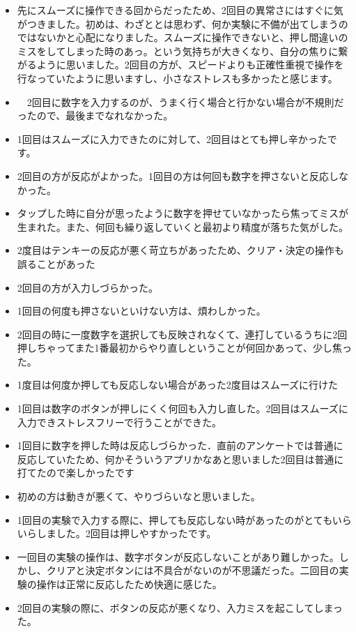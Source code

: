 \begin{itemize}
  \item 先にスムーズに操作できる回からだったため、2回目の異常さにはすぐに気がつきました。初めは、わざととは思わず、何か実験に不備が出てしまうのではないかと心配になりました。スムーズに操作できないと、押し間違いのミスをしてしまった時のあっ。という気持ちが大きくなり、自分の焦りに繋がるように思いました。2回目の方が、スピードよりも正確性重視で操作を行なっていたように思いますし、小さなストレスも多かったと感じます。
  \item 　2回目に数字を入力するのが、うまく行く場合と行かない場合が不規則だったので、最後までなれなかった。
  \item 1回目はスムーズに入力できたのに対して、2回目はとても押し辛かったです。
  \item 2回目の方が反応がよかった。1回目の方は何回も数字を押さないと反応しなかった。
  \item タップした時に自分が思ったように数字を押せていなかったら焦ってミスが生まれた。また、何回も繰り返していくと最初より精度が落ちた気がした。
  \item 2度目はテンキーの反応が悪く苛立ちがあったため、クリア・決定の操作も誤ることがあった
  \item 2回目の方が入力しづらかった。
  \item 1回目の何度も押さないといけない方は、煩わしかった。
  \item 2回目の時に一度数字を選択しても反映されなくて、連打しているうちに2回押しちゃってまた1番最初からやり直しということが何回かあって、少し焦った。
  \item 1度目は何度か押しても反応しない場合があった2度目はスムーズに行けた
  \item 1回目は数字のボタンが押しにくく何回も入力し直した。2回目はスムーズに入力できストレスフリーで行うことができた。
  \item 1回目に数字を押した時は反応しづらかった．直前のアンケートでは普通に反応していたため、何かそういうアプリかなあと思いました2回目は普通に打てたので楽しかったです
  \item 初めの方は動きが悪くて、やりづらいなと思いました。
  \item 1回目の実験で入力する際に、押しても反応しない時があったのがとてもいらいらしました。2回目は押しやすかったです。
  \item 一回目の実験の操作は、数字ボタンが反応しないことがあり難しかった。しかし、クリアと決定ボタンには不具合がないのが不思議だった。二回目の実験の操作は正常に反応したため快適に感じた。
  \item 2回目の実験の際に、ボタンの反応が悪くなり、入力ミスを起こしてしまった。

\end{itemize}
